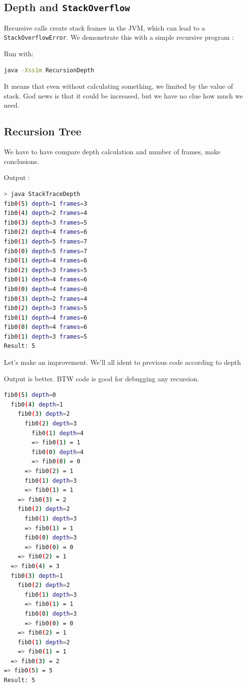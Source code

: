 \documentclass{article}
\begin{document}
\subsection{Depth and \lstinline[basicstyle=\ttfamily\small]{StackOverflow}}
Recursive calls create stack frames in the JVM, which can lead to a \texttt{StackOverflowError}. We demonstrate this with a simple recursive program :

Run with:
\begin{lstlisting}[language=bash,caption={Running RecursionDepth}, nolol]
	java -Xss1m RecursionDepth
\end{lstlisting}

It means that even without calculating something, we limited by the value of stack. God news is that it could be increased, but we have no clue how much we need.

\subsection{Recursion Tree}

We have to have compare depth calculation and number of frames, make conclusions.

Output : 
\begin{lstlisting}[language=bash]
> java StackTraceDepth
fib0(5) depth=1 frames=3
fib0(4) depth=2 frames=4
fib0(3) depth=3 frames=5
fib0(2) depth=4 frames=6
fib0(1) depth=5 frames=7
fib0(0) depth=5 frames=7
fib0(1) depth=4 frames=6
fib0(2) depth=3 frames=5
fib0(1) depth=4 frames=6
fib0(0) depth=4 frames=6
fib0(3) depth=2 frames=4
fib0(2) depth=3 frames=5
fib0(1) depth=4 frames=6
fib0(0) depth=4 frames=6
fib0(1) depth=3 frames=5
Result: 5
\end{lstlisting}

Let's make an improvement. We'll all ident to previous code according to depth

\newpage
Output is better. BTW code is good for debugging any recursion.
\begin{lstlisting}[language=bash]
fib0(5) depth=0
  fib0(4) depth=1
    fib0(3) depth=2
      fib0(2) depth=3
        fib0(1) depth=4
        => fib0(1) = 1
        fib0(0) depth=4
        => fib0(0) = 0
      => fib0(2) = 1
      fib0(1) depth=3
      => fib0(1) = 1
    => fib0(3) = 2
    fib0(2) depth=2
      fib0(1) depth=3
      => fib0(1) = 1
      fib0(0) depth=3
      => fib0(0) = 0
    => fib0(2) = 1
  => fib0(4) = 3
  fib0(3) depth=1
    fib0(2) depth=2
      fib0(1) depth=3
      => fib0(1) = 1
      fib0(0) depth=3
      => fib0(0) = 0
    => fib0(2) = 1
    fib0(1) depth=2
    => fib0(1) = 1
  => fib0(3) = 2
=> fib0(5) = 5
Result: 5
\end{lstlisting}
\end{document}
